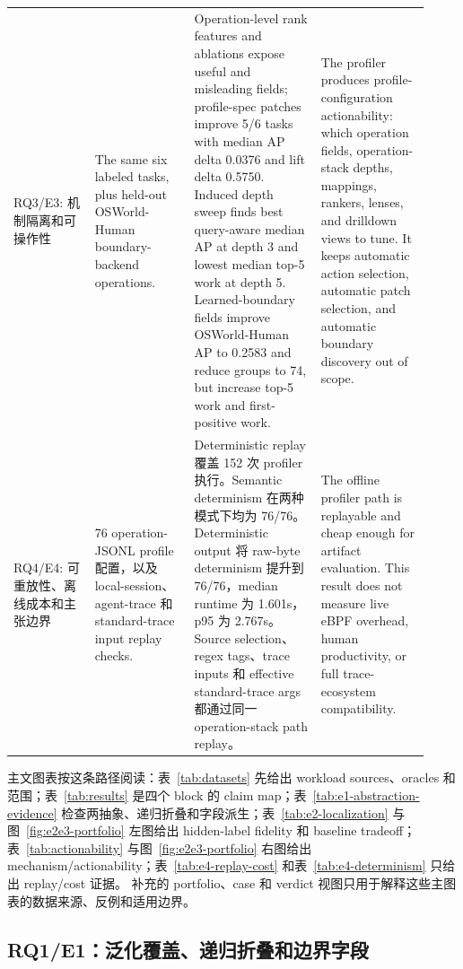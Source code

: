 \documentclass[10pt,twocolumn]{ctexart}
\begin{document}
\begin{table}[t]
\begin{tabular}{p{0.18\linewidth}p{0.22\linewidth}p{0.28\linewidth}p{0.24\linewidth}}
    RQ3/E3: 机制隔离和可操作性 & The same six labeled tasks, plus held-out OSWorld-Human boundary-backend operations. & Operation-level rank features and ablations expose useful and misleading fields; profile-spec patches improve 5/6 tasks with median AP delta 0.0376 and lift delta 0.5750. Induced depth sweep finds best query-aware median AP at depth 3 and lowest median top-5 work at depth 5. Learned-boundary fields improve OSWorld-Human AP to 0.2583 and reduce groups to 74, but increase top-5 work and first-positive work. & The profiler produces profile-configuration actionability: which operation fields, operation-stack depths, mappings, rankers, lenses, and drilldown views to tune. It keeps automatic action selection, automatic patch selection, and automatic boundary discovery out of scope. \\
    RQ4/E4: 可重放性、离线成本和主张边界 & 76 operation-JSONL profile 配置，以及 local-session、agent-trace 和 standard-trace input replay checks. & Deterministic replay 覆盖 152 次 profiler 执行。Semantic determinism 在两种模式下均为 76/76。Deterministic output 将 raw-byte determinism 提升到 76/76，median runtime 为 1.601s，p95 为 2.767s。Source selection、regex tags、trace inputs 和 effective standard-trace args 都通过同一 operation-stack path replay。 & The offline profiler path is replayable and cheap enough for artifact evaluation. This result does not measure live eBPF overhead, human productivity, or full trace-ecosystem compatibility. \\
    \bottomrule
\end{tabular}
\end{table}

主文图表按这条路径阅读：表~\ref{tab:datasets} 先给出 workload sources、oracles 和范围；表~\ref{tab:results} 是四个 block 的 claim map；表~\ref{tab:e1-abstraction-evidence} 检查两抽象、递归折叠和字段派生；表~\ref{tab:e2-localization} 与图~\ref{fig:e2e3-portfolio} 左图给出 hidden-label fidelity 和 baseline tradeoff；表~\ref{tab:actionability} 与图~\ref{fig:e2e3-portfolio} 右图给出 mechanism/actionability；表~\ref{tab:e4-replay-cost} 和表~\ref{tab:e4-determinism} 只给出 replay/cost 证据。
补充的 portfolio、case 和 verdict 视图只用于解释这些主图表的数据来源、反例和适用边界。

\subsection{RQ1/E1：泛化覆盖、递归折叠和边界字段}
\end{document}
